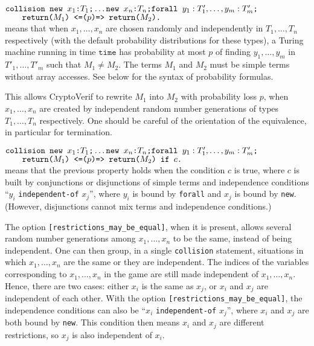 \begin{itemize}
$\texttt{collision }\texttt{new\ }{x_1}\texttt{:}{T_1}\texttt{;}\ldots 
\texttt{new\ }{x_n}\texttt{:}{T_n}\texttt{;}
\texttt{forall }y_1:T'_1, \ldots, y_m:T'_m\texttt{;}$\\
$\null\qquad \texttt{return(}M_1\texttt{) <=(}p\texttt{)=> return(}M_2\texttt{).}$\\
means that when
$x_1, \ldots, x_n$ are chosen randomly 
and independently in $T_1, \ldots, T_n$ respectively (with the default probability distributions for these types), a Turing machine running in
time $\texttt{time}$ has probability at most $p$ of finding
$y_1, \ldots, y_m$ in $T'_1, \ldots, T'_m$ such that $M_1 \neq M_2$.
%
The terms $M_1$ and $M_2$ must be simple terms without array accesses.
See below for the syntax of probability formulas.

This allows CryptoVerif to rewrite $M_1$ into $M_2$ with probability
loss $p$, when $x_1, \ldots, x_n$ are created by independent random
number generations of types $T_1, \ldots, T_n$ respectively. One
should be careful of the orientation of the equivalence, in particular
for termination.

$\texttt{collision }\texttt{new\ }{x_1}\texttt{:}{T_1}\texttt{;}\ldots 
\texttt{new\ }{x_n}\texttt{:}{T_n}\texttt{;}
\texttt{forall }y_1:T'_1, \ldots, y_m:T'_m\texttt{;}$\\
$\null\qquad \texttt{return(}M_1\texttt{) <=(}p\texttt{)=> return(}M_2\texttt{) if $c$.}$\\
means that the previous property holds when the condition $c$ is true, where
$c$ is built by conjunctions or disjunctions of simple terms and independence conditions ``$y_i$ \texttt{independent-of} $x_j$'',
where $y_i$ is bound by  \texttt{forall} and $x_j$ is bound by \texttt{new}. (However, disjunctions cannot
mix terms and independence conditions.)

The option \texttt{[restrictions\_may\_be\_equal]}, when it is present, allows several 
random number generations among $x_1, \ldots, x_n$ to be the same, instead of being
independent. One can then group, in a single \texttt{collision} statement, 
situations in which $x_1, \ldots, x_n$ are the same or they are independent.
The indices of the variables corresponding to $x_1, \ldots, x_n$
in the game are still made independent of $x_1, \ldots, x_n$. 
Hence, there are two cases: either $x_i$ is the same as $x_j$, or
$x_i$ and $x_j$ are independent of each other. With the option \texttt{[restrictions\_may\_be\_equal]}, 
the independence conditions can also be ``$x_i$ \texttt{independent-of} $x_j$'',
where $x_i$ and $x_j$ are both bound by \texttt{new}. This condition
then means $x_i$ and $x_j$ are different restrictions, so
$x_j$ is also independent of $x_i$. 


\end{itemize}
